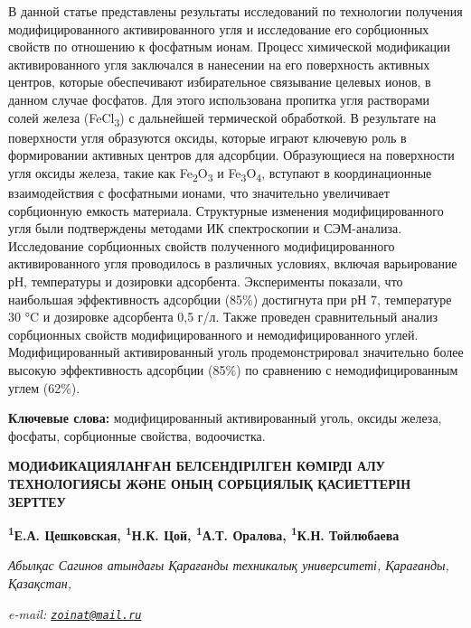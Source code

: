 В данной статье представлены результаты исследований по технологии
получения модифицированного активированного угля и исследование его
сорбционных свойств по отношению к фосфатным ионам. Процесс химической
модификации активированного угля заключался в нанесении на его
поверхность активных центров, которые обеспечивают избирательное
связывание целевых ионов, в данном случае фосфатов. Для этого
использована пропитка угля растворами солей железа
(FeCl\textsubscript{3}) с дальнейшей термической обработкой. В
результате на поверхности угля образуются оксиды, которые играют
ключевую роль в формировании активных центров для адсорбции.
Образующиеся на поверхности угля оксиды железа, такие как
Fe\textsubscript{2}O\textsubscript{3} и
Fe\textsubscript{3}O\textsubscript{4}, вступают в координационные
взаимодействия с фосфатными ионами, что значительно увеличивает
сорбционную емкость материала. Структурные изменения модифицированного
угля были подтверждены методами ИК спектроскопии и СЭМ-анализа.
Исследование сорбционных свойств полученного модифицированного
активированного угля проводилось в различных условиях, включая
варьирование рН, температуры и дозировки адсорбента. Эксперименты
показали, что наибольшая эффективность адсорбции (85\%) достигнута при
рН 7, температуре 30 °C и дозировке адсорбента 0,5 г/л. Также проведен
сравнительный анализ сорбционных свойств модифицированного и
немодифицированного углей. Модифицированный активированный уголь
продемонстрировал значительно более высокую эффективность адсорбции
(85\%) по сравнению с немодифицированным углем (62\%).

{\bfseries Ключевые слова:} модифицированный активированный уголь, оксиды
железа, фосфаты, сорбционные свойства, водоочистка.

{\bfseries МОДИФИКАЦИЯЛАНҒАН БЕЛСЕНДІРІЛГЕН КӨМІРДІ АЛУ ТЕХНОЛОГИЯСЫ ЖӘНЕ
ОНЫҢ СОРБЦИЯЛЫҚ ҚАСИЕТТЕРІН ЗЕРТТЕУ}

{\bfseries \textsuperscript{1}Е.А. Цешковская, \textsuperscript{1}Н.К.
Цой\textsuperscript{\envelope }, \textsuperscript{1}А.Т. Оралова,
\textsuperscript{1}К.Н. Тойлюбаева}

\emph{Абылқас Сагинов атындағы Қарағанды техникалық университеті,
Қарағанды, Қазақстан,}

\emph{e-mail: \href{mailto:zoinat@mail.ru}{\nolinkurl{zoinat@mail.ru}}}

